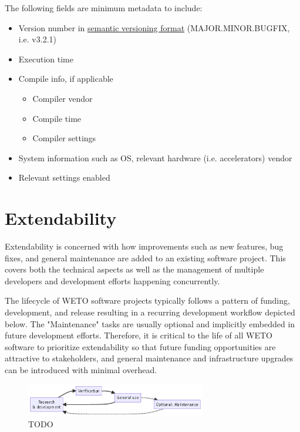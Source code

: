 \documentclass[]{nrel}
\begin{document}
The following fields are minimum metadata to include:
\begin{itemize}
\item Version number in \href{https://semver.org}{semantic versioning format} (MAJOR.MINOR.BUGFIX, i.e. v3.2.1)
\item Execution time

\item Compile info, if applicable
\begin{itemize}
\item Compiler vendor
\item Compile time
\item Compiler settings
\end{itemize}

\item System information such as OS, relevant hardware (i.e. accelerators) vendor
\item Relevant settings enabled

\end{itemize}


\chapter{Extendability}
\label{sec:extendability}
Extendability is concerned with how improvements such as new features, bug fixes, and general
maintenance are added to an existing software project. This covers both the technical aspects
as well as the management of multiple developers and development efforts happening
concurrently.

The lifecycle of WETO software projects typically follows a pattern of funding,
development, and release resulting in a recurring development workflow depicted below.
The "Maintenance" tasks are usually optional and implicitly embedded
in future development efforts. Therefore, it is critical to the life of all WETO software to
prioritize extendability so that future funding opportunities are attractive to stakeholders,
and general maintenance and infrastructure upgrades can be introduced with minimal overhead.

\begin{figure}[htbp] \begin{center}
\includegraphics[width=0.7\textwidth]{mermaid-d1bafe392e85b8f467e3d93074dc8d7b7c45dfd0.png}
\caption{TODO}
\label{fig:fig2} \end{center} \end{figure}
\end{document}
